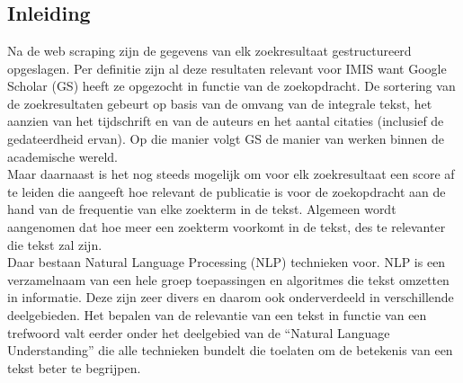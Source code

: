 
\chapter{}%
\label{ch:natural_language_processing}

\section{Inleiding}
Na de web scraping zijn de gegevens van elk zoekresultaat gestructureerd opgeslagen. Per definitie zijn al deze resultaten relevant voor IMIS want Google Scholar (GS) heeft ze opgezocht in functie van de zoekopdracht. De sortering van de zoekresultaten gebeurt op basis van de omvang van de integrale tekst, het aanzien van het tijdschrift en van de auteurs en het aantal citaties (inclusief de gedateerdheid ervan). Op die manier volgt GS de manier van werken binnen de academische wereld.\\
Maar daarnaast is het nog steeds mogelijk om voor elk zoekresultaat een score af te leiden die aangeeft hoe relevant de publicatie is voor de zoekopdracht aan de hand van de frequentie van elke zoekterm in de tekst. Algemeen wordt aangenomen dat hoe meer een zoekterm voorkomt in de tekst, des te relevanter die tekst zal zijn.\\
Daar bestaan Natural Language Processing (NLP) technieken voor. NLP is een verzamelnaam van een hele groep toepassingen en algoritmes die tekst omzetten in informatie. Deze zijn zeer divers en daarom ook onderverdeeld in verschillende deelgebieden. Het bepalen van de relevantie van een tekst in functie van een trefwoord valt eerder onder het deelgebied van de ``Natural Language Understanding'' die alle technieken bundelt die toelaten om de betekenis van een tekst beter te begrijpen.\\


